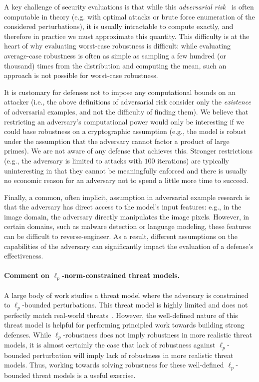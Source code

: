 \documentclass{article} %
\begin{document}
A key challenge of security evaluations is that while this
\emph{adversarial risk}~\citep{madry2017towards,uesato2018adversarial}
is often computable in theory (e.g. with optimal attacks or brute force enumeration of the considered perturbations),
it is usually intractable to compute exactly, and therefore
 in practice we must approximate this quantity.
%
This difficulty is at the heart of why evaluating worst-case robustness is difficult:
while evaluating average-case robustness is often as simple as sampling a few
hundred (or thousand) times from the distribution and computing the mean, such
an approach is not possible for worst-case robustness.

It is customary for defenses not to impose any computational bounds on an attacker (i.e., the above definitions of adversarial risk consider only the \emph{existence} of adversarial examples, and not the difficulty of finding them). We believe that restricting an adversary's computational power would only be interesting if we could base robustness on a cryptographic assumption (e.g., the model is robust under the assumption that the adversary cannot factor a product of large primes). We are not aware of any defense that achieves this. Stronger restrictions (e.g., the adversary is limited to attacks with $100$ iterations) are typically uninteresting in that they cannot be meaningfully enforced and there is usually no economic reason for an adversary not to spend a little more time to succeed.

Finally, a common, often implicit, assumption in adversarial example
research is that the adversary has direct access to the model's input
features: e.g., in the image domain, the adversary directly manipulates the image pixels.
%
However, in certain domains, such as malware detection or language
modeling, these features can be difficult to reverse-engineer.
%
As a result, different assumptions on the capabilities of the
adversary can significantly impact the evaluation of a defense's effectiveness.

\paragraph{Comment on $\ell_p$-norm-constrained threat models.}
%
A large body of work studies a threat model where the adversary is 
constrained to $\ell_p$-bounded perturbations.
%
This threat model is highly limited and does not perfectly match real-world
threats~\citep{engstrom2017rotation,gilmer2018motivating}.
%
However, the well-defined nature of this threat model is helpful
for performing principled work towards building strong defenses.
%
While $\ell_p$-robustness does not imply robustness in more realistic
threat models, it is almost certainly the case that lack of robustness
against $\ell_p$-bounded perturbation will imply lack of robustness in more
realistic threat models.
%
Thus, working towards solving robustness
for these well-defined $\ell_p$-bounded threat models
is a useful exercise.
\end{document}
